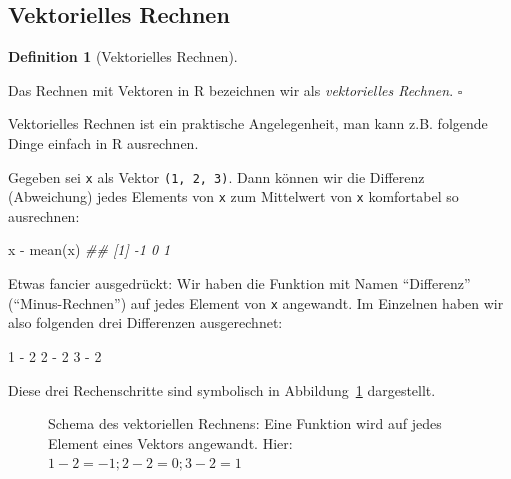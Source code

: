 \documentclass[
  letterpaper,
  oneside,
  open=any]{scrbook}
\newenvironment{Shaded}{\begin{snugshade}}{\end{snugshade}}
\newcommand{\DecValTok}[1]{\textcolor[rgb]{0.68,0.00,0.00}{#1}}
\newcommand{\DocumentationTok}[1]{\textcolor[rgb]{0.37,0.37,0.37}{\textit{#1}}}
\newcommand{\FunctionTok}[1]{\textcolor[rgb]{0.28,0.35,0.67}{#1}}
\newcommand{\NormalTok}[1]{\textcolor[rgb]{0.00,0.23,0.31}{#1}}
\newcommand{\SpecialCharTok}[1]{\textcolor[rgb]{0.37,0.37,0.37}{#1}}
\theoremstyle{definition}
\theoremstyle{definition}
\theoremstyle{definition}
\newtheorem{definition}{Definition}[chapter]
\theoremstyle{remark}
\begin{document}
\subsection{Vektorielles Rechnen}\label{sec-veccalc}

\begin{definition}[Vektorielles
Rechnen]\protect\hypertarget{def-veccalc}{}\label{def-veccalc}

Das Rechnen mit Vektoren in R bezeichnen wir als \emph{vektorielles
Rechnen}. \(\square\)

\end{definition}

Vektorielles Rechnen ist ein praktische Angelegenheit, man kann z.B.
folgende Dinge einfach in R ausrechnen.

Gegeben sei \texttt{x} als Vektor \texttt{(1,\ 2,\ 3)}. Dann können wir
die Differenz (Abweichung) jedes Elements von \texttt{x} zum Mittelwert
von \texttt{x} komfortabel so ausrechnen:

\begin{Shaded}
\begin{Highlighting}[]
\NormalTok{x }\SpecialCharTok{{-}} \FunctionTok{mean}\NormalTok{(x)}
\DocumentationTok{\#\# [1] {-}1  0  1}
\end{Highlighting}
\end{Shaded}

Etwas fancier ausgedrückt: Wir haben die Funktion mit Namen
\enquote{Differenz} (\enquote{Minus-Rechnen}) auf jedes Element von
\texttt{x} angewandt. Im Einzelnen haben wir also folgenden drei
Differenzen ausgerechnet:

\begin{Shaded}
\begin{Highlighting}[]
\DecValTok{1} \SpecialCharTok{{-}} \DecValTok{2}
\DecValTok{2} \SpecialCharTok{{-}} \DecValTok{2}
\DecValTok{3} \SpecialCharTok{{-}} \DecValTok{2}
\end{Highlighting}
\end{Shaded}

Diese drei Rechenschritte sind symbolisch in
Abbildung~\ref{fig-vektoriell} dargestellt.

\begin{figure}


\caption{\label{fig-vektoriell}Schema des vektoriellen Rechnens: Eine
Funktion wird auf jedes Element eines Vektors angewandt. Hier:
\(1-2=-1; 2-2=0; 3-2=1\)}

\end{figure}%
\end{document}
